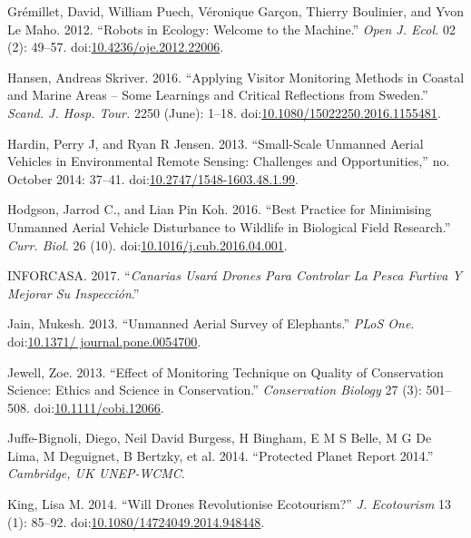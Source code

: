 \documentclass[]{interact}
\theoremstyle{plain}%
\theoremstyle{definition}
\theoremstyle{remark}
\begin{document}
\hypertarget{ref-gremillet_robots_2012}{}
Grémillet, David, William Puech, Véronique Garçon, Thierry Boulinier,
and Yvon Le Maho. 2012. ``Robots in Ecology: Welcome to the Machine.''
\emph{Open J. Ecol.} 02 (2): 49--57.
doi:\href{https://doi.org/10.4236/oje.2012.22006}{10.4236/oje.2012.22006}.

\hypertarget{ref-hansen_applying_2016}{}
Hansen, Andreas Skriver. 2016. ``Applying Visitor Monitoring Methods in
Coastal and Marine Areas -- Some Learnings and Critical Reflections from
Sweden.'' \emph{Scand. J. Hosp. Tour.} 2250 (June): 1--18.
doi:\href{https://doi.org/10.1080/15022250.2016.1155481}{10.1080/15022250.2016.1155481}.

\hypertarget{ref-hardin_small-scale_2013}{}
Hardin, Perry J, and Ryan R Jensen. 2013. ``Small-Scale Unmanned Aerial
Vehicles in Environmental Remote Sensing: Challenges and
Opportunities,'' no. October 2014: 37--41.
doi:\href{https://doi.org/10.2747/1548-1603.48.1.99}{10.2747/1548-1603.48.1.99}.

\hypertarget{ref-hodgson_best_2016}{}
Hodgson, Jarrod C., and Lian Pin Koh. 2016. ``Best Practice for
Minimising Unmanned Aerial Vehicle Disturbance to Wildlife in Biological
Field Research.'' \emph{Curr. Biol.} 26 (10).
doi:\href{https://doi.org/10.1016/j.cub.2016.04.001}{10.1016/j.cub.2016.04.001}.

\hypertarget{ref-Canarias2017}{}
INFORCASA. 2017. ``\emph{Canarias Usará Drones Para Controlar La Pesca
Furtiva Y Mejorar Su Inspección}.''

\hypertarget{ref-jain_unmanned_2013}{}
Jain, Mukesh. 2013. ``Unmanned Aerial Survey of Elephants.'' \emph{PLoS
One}.
doi:\href{https://doi.org/10.1371/\%20journal.pone.0054700}{10.1371/ journal.pone.0054700}.

\hypertarget{ref-jewell_effect_2013}{}
Jewell, Zoe. 2013. ``Effect of Monitoring Technique on Quality of
Conservation Science: Ethics and Science in Conservation.''
\emph{Conservation Biology} 27 (3): 501--508.
doi:\href{https://doi.org/10.1111/cobi.12066}{10.1111/cobi.12066}.

\hypertarget{ref-juffe-bignoli_protected_2014}{}
Juffe-Bignoli, Diego, Neil David Burgess, H Bingham, E M S Belle, M G De
Lima, M Deguignet, B Bertzky, et al. 2014. ``Protected Planet Report
2014.'' \emph{Cambridge, UK UNEP-WCMC}.

\hypertarget{ref-king_will_2014}{}
King, Lisa M. 2014. ``Will Drones Revolutionise Ecotourism?'' \emph{J.
Ecotourism} 13 (1): 85--92.
doi:\href{https://doi.org/10.1080/14724049.2014.948448}{10.1080/14724049.2014.948448}.
\end{document}
